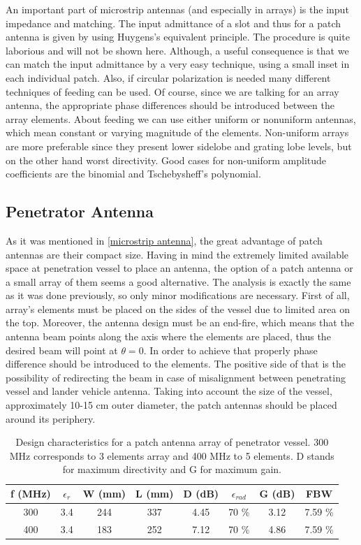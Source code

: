 An important part of microstrip antennas (and especially in arrays) is the input impedance and matching. The input admittance of a slot and thus for a patch antenna is given by using Huygens's equivalent principle. The procedure is quite laborious and will not be shown here. Although, a useful consequence is that we can match the input admittance by a very easy technique, using a small inset in each individual patch. Also, if circular polarization is needed many different techniques of feeding can be used. Of course, since we are talking for an array antenna, the appropriate phase differences should be introduced between the array elements. About feeding we can use either uniform or nonuniform antennas, which mean constant or varying magnitude of the elements. Non-uniform arrays are more preferable since they present lower sidelobe and grating lobe levels, but on the other hand worst directivity. Good cases for non-uniform amplitude coefficients are the binomial and Tschebysheff's polynomial. 

\subsection{Penetrator Antenna}

As it was mentioned in \ref{microstrip antenna}, the great advantage of patch antennas are their compact size. Having in mind the extremely limited available space at penetration vessel to place an antenna, the option of a patch antenna or a small array of them seems a good alternative. The analysis is exactly the same as it was done previously, so only minor modifications are necessary. First of all, array's elements must be placed on the sides of the vessel due to limited area on the top. Moreover, the antenna design must be an end-fire, which means that the antenna beam points along the axis where the elements are placed, thus the desired beam will point at $\theta=0$. In order to achieve that properly phase difference should be introduced to the elements. The positive side of that is the possibility of redirecting the beam in case of misalignment between penetrating vessel and lander vehicle antenna. Taking into account the size of the vessel, approximately 10-15 cm outer diameter, the patch antennas should be placed around its periphery. 

\begin{table}[ht]
\centering
\begin{tabular}{| c | c | c | c | c | c | c | c |}
\hline
 \textbf{f (MHz)} & \textbf{$\epsilon_{r}$} & \textbf{W (mm)} & \textbf{L (mm)} & \textbf{D (dB)} & \textbf{$\epsilon_{rad}$} & \textbf{G (dB)} & FBW \\ 
 \hline
 300 & 3.4 & 244 & 337 & 4.45 & 70 \% & 3.12 & 7.59 \% \\
 \hline
 400 & 3.4 & 183 & 252 & 7.12 & 70 \% & 4.86 & 7.59 \% \\
 \hline
\end{tabular}
\caption{Design characteristics for a patch antenna array of penetrator vessel. 300 MHz corresponds to 3 elements array and 400 MHz to 5 elements. D stands for maximum directivity and G for maximum gain.}
\label{table: results_pen}
\end{table}

